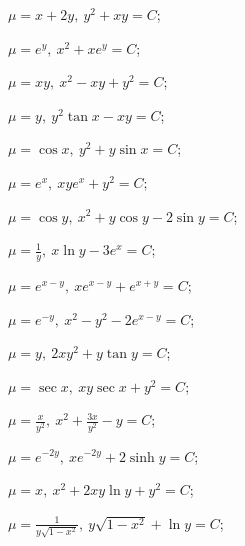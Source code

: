 \begin{enumsols}
		\label{sol:firstorder:intfactor}
		\item \( \mu = x + 2y, ~ y^2 + xy = C \); \sfill %
		\item \( \mu = e^{y}, ~ x^2 + xe^{y} = C \); \sfill %
		\item \( \mu = xy, ~ x^2 - xy + y^2 = C \); \sfill %
		\item \( \mu = y, ~ y^2 \tan{x} - xy = C \); \sfill %
		\item \( \mu = \cos{x}, ~ y^2 + y \sin{x} = C \); \sfill %
		\item \( \mu = e^{x}, ~ xye^{x} + y^2 = C \); \sfill %
		\item \( \mu = \cos{y}, ~ x^2 + y \cos{y} - 2 \sin{y} = C \); \sfill %
		\item \( \mu = \frac{1}{y}, ~ x \ln{y} - 3e^{x} = C \); \sfill %
		\item \( \mu = e^{x - y}, ~ xe^{x - y} + e^{x + y} = C \); \sfill %
		\item \( \mu = e^{-y}, ~ x^2 - y^2 - 2e^{x - y} = C \); \sfill %
		\item \( \mu = y, ~ 2xy^2 + y \tan{y} = C \); \sfill %
		\item \( \mu = \sec{x}, ~ xy\sec{x} + y^2 = C \); \sfill %
		\item \( \mu = \frac{x}{y^2}, ~ x^2 + \frac{3x}{y^2} - y = C \); \sfill %
		\item \( \mu = e^{-2y}, ~ xe^{-2y} + 2 \sinh{y} = C \); \sfill %
		\item \( \mu = x, ~ x^2 + 2xy \ln{y} + y^2 = C \); \sfill %
		\item \( \mu = \frac{1}{y \sqrt{1 - x^2}}, ~ y \sqrt{1 - x^2} + \ln{y} = C \); \sfill %

\end{enumsols}

